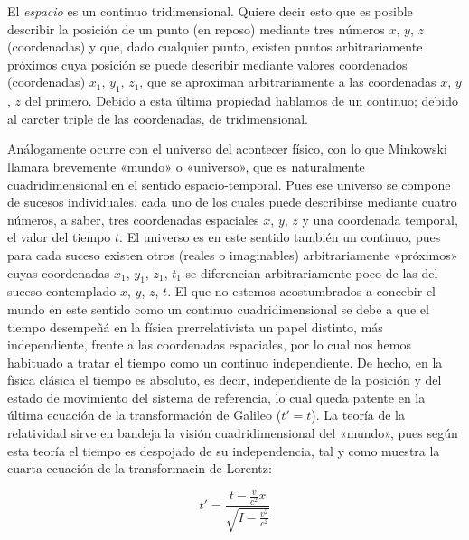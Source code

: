 \documentclass[spanish]{book}
\begin{document}
El \textit{espacio} es un continuo tridimensional. Quiere decir esto que es posible
describir la posición de un punto (en reposo) mediante tres números $x$, $y$, $z$ (coordenadas)
y que, dado cualquier punto, existen puntos arbitrariamente próximos cuya
posición se puede describir mediante valores coordenados (coordenadas)
$x_{1}$, $y_{1}$, $z_{1}$, que se aproximan arbitrariamente a las coordenadas 
$x$, $y$, $z$ del primero. Debido a esta última propiedad hablamos de un continuo; 
debido al carcter triple de las coordenadas, de tridimensional.

Análogamente ocurre con el universo del acontecer físico, con lo que Minkowski
llamara brevemente «mundo» o «universo», que es naturalmente cuadridimensional
en el sentido espacio-temporal. Pues ese universo se compone de sucesos individuales,
cada uno de los cuales puede describirse mediante cuatro números, a saber, tres
coordenadas espaciales $x$, $y$, $z$ y una coordenada temporal, el valor del tiempo $t$. El
universo es en este sentido también un continuo, pues para cada suceso existen
otros (reales o imaginables) arbitrariamente «próximos» cuyas coordenadas $x_{1}$, $y_{1}$, $z_{1}$, $t_{1}$
se diferencian arbitrariamente poco de las del suceso contemplado $x$, $y$, $z$, $t$. El que
no estemos acostumbrados a concebir el mundo en este sentido como un continuo
cuadridimensional se debe a que el tiempo desempeñá en la física prerrelativista un
papel distinto, más independiente, frente a las coordenadas espaciales, por lo cual nos
hemos habituado a tratar el tiempo como un continuo independiente. De hecho, en
la física clásica el tiempo es absoluto, es decir, independiente de la posición y del estado
de movimiento del sistema de referencia, lo cual queda patente en la última ecuación
de la transformación de Galileo ($t'=t$). La teoría de la relatividad sirve en bandeja
la visión cuadridimensional del «mundo», pues según esta teoría el tiempo es
despojado de su independencia, tal y como muestra la cuarta ecuación de la
transformacin de Lorentz:

\[t'=\frac{t-\frac{v}{c^{2}}x}{\sqrt{I-\frac{v^{2}}{c^{2}}}}\]
 ~
\end{document}
